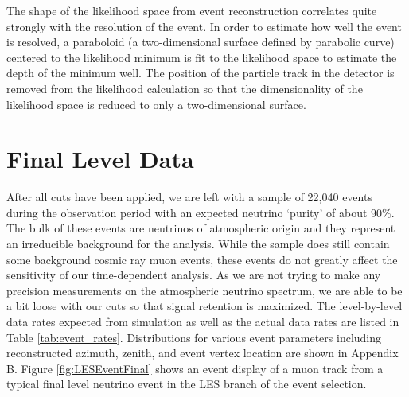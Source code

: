 \documentclass{gatech-thesis}
\begin{document}
The shape of the likelihood space from event reconstruction correlates quite strongly with the resolution of the event. In order to estimate how well the event is resolved, a paraboloid (a two-dimensional surface defined by parabolic curve) centered to the likelihood minimum is fit to the likelihood space to estimate the depth of the minimum well. The position of the particle track in the detector is removed from the likelihood calculation so that the dimensionality of the likelihood space is reduced to only a two-dimensional surface.

\section{Final Level Data}
After all cuts have been applied, we are left with a sample of 22,040 events during the observation period with an expected neutrino `purity' of about 90$\%$. The bulk of these events are neutrinos of atmospheric origin and they represent an irreducible background for the analysis. While the sample does still contain some background cosmic ray muon events, these events do not greatly affect the sensitivity of our time-dependent analysis. As we are not trying to make any precision measurements on the atmospheric neutrino spectrum, we are able to be a bit loose with our cuts so that signal retention is maximized. The level-by-level data rates expected from simulation as well as the actual data rates are listed in Table \ref{tab:event_rates}. Distributions for various event parameters including reconstructed azimuth, zenith, and event vertex location are shown in Appendix B. Figure \ref{fig:LESEventFinal} shows an event display of a muon track from a typical final level neutrino event in the LES branch of the event selection. 
\end{document}
